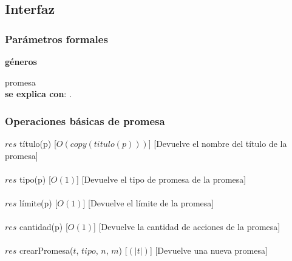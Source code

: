 \subsection{Interfaz}


  \subsubsection{Par\'ametros formales}
   \parbox{1.7cm}{\textbf{g\'eneros}} promesa\\

  \textbf{se explica con}: .


  \subsubsection{Operaciones b\'asicas de promesa}
  {$res$ \igobs t\'itulo(p)}
  [$O(copy(titulo(p)))$]
  [Devuelve el nombre del t\'itulo de la promesa]\\\\
  {$res$ \igobs tipo(p)}
  [$O(1)$]
  [Devuelve el tipo de promesa de la promesa]\\\\
  {$res$ \igobs l\'imite(p)}
  [$O(1)$]
  [Devuelve el l\'imite de la promesa]\\\\
  {$res$ \igobs cantidad(p)}
  [$O(1)$]
  [Devuelve la cantidad de acciones de la promesa]\\\\
  {$res$ \igobs crearPromesa($t$, $tipo$, $n$, $m$)}
  [$(|t|)$]
  [Devuelve una nueva promesa]\\\\


